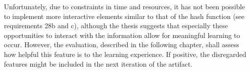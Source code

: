 Unfortunately, due to constraints in time and resources, it has not been possible to implement more interactive elements similar to that of the hash function (see requirements 28b and c), although the thesis suggests that especially these opportunities to interact with the information allow for meaningful learning to occur. However, the evaluation, described in the following chapter, shall assess how helpful this feature is to the learning experience. If positive, the disregarded features might be included in the next iteration of the artifact. 